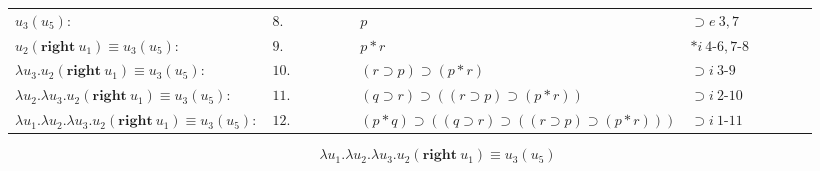 \documentclass[11pt,a4paper]{article}
\begin{document}
\begin{itemize}
\begin{table}[H]
\begin{tabular}{*{12}{l}}
			$u_3(u_5):$ & $8.$ & \multicolumn{1}{|c}{} & \multicolumn{1}{|c}{} & \multicolumn{1}{|c}{} & \multicolumn{1}{|c}{} & $p$ & $\supset e \ 3, 7$ & \multicolumn{1}{c|}{} & \multicolumn{1}{c|}{} & \multicolumn{1}{c|}{} &\multicolumn{1}{c|}{}\\
			
			\cline{6-9}
			
			$u_2(\textbf{right} \ u_1) \equiv u_3(u_5):$ & $9.$ & \multicolumn{1}{|c}{} & \multicolumn{1}{|c}{} & \multicolumn{1}{|c}{} & & $p * r$ & $* i \ 4$-$6, 7$-$8$ & & \multicolumn{1}{c|}{} & \multicolumn{1}{c|}{} &\multicolumn{1}{c|}{}\\
			
			\cline{5-10}
			
			$\lambda u_3 . u_2(\textbf{right} \ u_1) \equiv u_3(u_5):$ & $10.$ & \multicolumn{1}{|c}{} & \multicolumn{1}{|c}{} & & & $(r \supset p) \supset (p * r)$ & $\supset i \ 3$-$9$ & & & \multicolumn{1}{c|}{} &\multicolumn{1}{c|}{}\\
						
			\cline{4-11}
			
			$\lambda u_2 . \lambda u_3 . u_2(\textbf{right} \ u_1) \equiv u_3(u_5):$ & $11.$ & \multicolumn{1}{|c}{} & & & & $(q \supset r) \supset ((r \supset p) \supset (p * r))$ & $\supset i \ 2$-$10$ & & & &\multicolumn{1}{c|}{}\\
			
			\cline{3-12}
			
			$\lambda u_1 . \lambda u_2 . \lambda u_3 . u_2(\textbf{right} \ u_1) \equiv u_3(u_5):$ & $12.$ & & & & & $(p * q) \supset ((q \supset r) \supset ((r \supset p) \supset (p * r)))$ & $\supset i \ 1$-$11$ & & & &\\
		
		\end{tabular}
		
		\end{table}
		
		\[ \boxed{\lambda u_1 . \lambda u_2 . \lambda u_3 . u_2(\textbf{right} \ u_1) \equiv u_3(u_5)} \]

\end{itemize}



\end{document}
